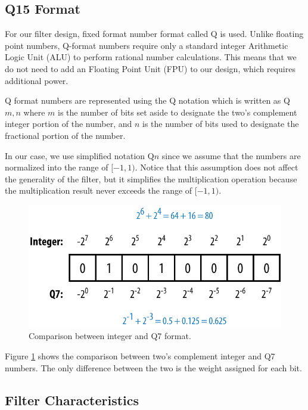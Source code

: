\subsection{Q15 Format} \label{sec:q15}

For our filter design, fixed format number format called Q is used. Unlike floating point numbers, Q-format numbers require only a standard integer Arithmetic Logic Unit (ALU) to perform rational number calculations. This means that we do not need to add an Floating Point Unit (FPU) to our design, which requires additional power.

Q format numbers are represented using the Q notation which is written as Q$m,n$ where $m$ is the number of bits set aside to designate the two's complement integer portion of the number, and $n$ is the number of bits used to designate the fractional portion of the number.

In our case, we use simplified notation Q$n$ since we assume that the numbers are normalized into the range of $[-1, 1)$. Notice that this assumption does not affect the generality of the filter, but it simplifies the multiplication operation because the multiplication result never exceeds the range of $[-1, 1)$.

\begin{figure}[htbp]
	\centering
	\includegraphics[scale=1.5]{images/q7}
	\caption{Comparison between integer and Q7 format.}
	\label{fig:q7}
\end{figure}

Figure \ref{fig:q7} shows the comparison between two's complement integer and Q7 numbers. The only difference between the two is the weight assigned for each bit.

\subsection{Filter Characteristics}

